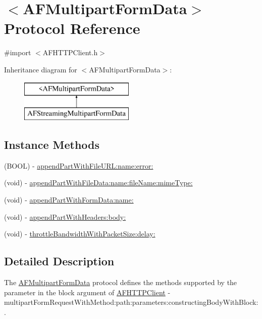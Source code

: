 \hypertarget{protocol_a_f_multipart_form_data-p}{\section{$<$A\-F\-Multipart\-Form\-Data$>$ Protocol Reference}
\label{protocol_a_f_multipart_form_data-p}
}


{\ttfamily \#import $<$A\-F\-H\-T\-T\-P\-Client.\-h$>$}

Inheritance diagram for $<$A\-F\-Multipart\-Form\-Data$>$\-:\begin{figure}[H]
\begin{center}
\leavevmode
\includegraphics[height=2.000000cm]{protocol_a_f_multipart_form_data-p}
\end{center}
\end{figure}
\subsection*{Instance Methods}
\begin{DoxyCompactItemize}
\item 
(B\-O\-O\-L) -\/ \hyperlink{protocol_a_f_multipart_form_data-p_a85eb0e9d04e80e720223434f6fd9230c}{append\-Part\-With\-File\-U\-R\-L\-:name\-:error\-:}
\item 
(void) -\/ \hyperlink{protocol_a_f_multipart_form_data-p_a4a65904d2372503bace2e45549a9d088}{append\-Part\-With\-File\-Data\-:name\-:file\-Name\-:mime\-Type\-:}
\item 
(void) -\/ \hyperlink{protocol_a_f_multipart_form_data-p_a0bc8ad1aa207469b218d2957245177b3}{append\-Part\-With\-Form\-Data\-:name\-:}
\item 
(void) -\/ \hyperlink{protocol_a_f_multipart_form_data-p_a09265f88e7b4ac0abab873a1105487a3}{append\-Part\-With\-Headers\-:body\-:}
\item 
(void) -\/ \hyperlink{protocol_a_f_multipart_form_data-p_ad8bf94a09638cf8147dda98472b1c42d}{throttle\-Bandwidth\-With\-Packet\-Size\-:delay\-:}
\end{DoxyCompactItemize}


\subsection{Detailed Description}
The {\ttfamily \hyperlink{protocol_a_f_multipart_form_data-p}{A\-F\-Multipart\-Form\-Data}} protocol defines the methods supported by the parameter in the block argument of {\ttfamily \hyperlink{interface_a_f_h_t_t_p_client}{A\-F\-H\-T\-T\-P\-Client} -\/multipart\-Form\-Request\-With\-Method\-:path\-:parameters\-:constructing\-Body\-With\-Block\-:}. 

